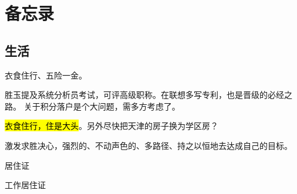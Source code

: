 \chapter{备忘录}

\section{生活}

衣食住行、五险一金。

胜玉提及系统分析员考试，可评高级职称。在联想多写专利，也是晋级的必经之路。
关于积分落户是个大问题，需多方考虑了。

\hl{衣食住行，住是大头}。另外尽快把天津的房子换为学区房？

激发求胜决心，强烈的、不动声色的、多路径、持之以恒地去达成自己的目标。

居住证

工作居住证


